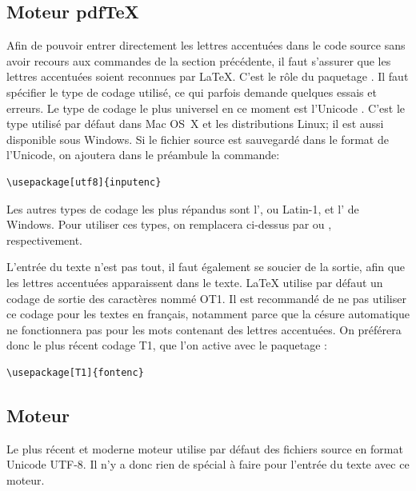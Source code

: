 \subsection{Moteur pdf\TeX}
\label{sec:bases:francais:pdftex}

Afin de pouvoir entrer directement les lettres accentuées dans le code
source sans avoir recours aux commandes de la section précédente, il
faut s'assurer que les lettres accentuées soient reconnues par
{\LaTeX}. C'est le rôle du paquetage  \citep{inputenc}.
Il faut spécifier le type de codage utilisé, ce qui parfois demande
quelques essais et erreurs. Le type de codage le plus universel en ce
moment est l'Unicode \citep{Unicode:5.0}. C'est le type utilisé par
défaut dans Mac OS~X et les distributions Linux; il est aussi
disponible sous Windows. Si le fichier source est sauvegardé dans le
format %
de l'Unicode, on ajoutera dans le préambule la commande:
\begin{lstlisting}
\usepackage[utf8]{inputenc}
\end{lstlisting}

Les autres types de codage les plus répandus sont
l', ou
Latin-1, et l'
de Windows. Pour utiliser ces types, on remplacera 
ci-dessus par  ou , respectivement.

L'entrée du texte n'est pas tout, il faut également se soucier de la
sortie, afin que les lettres accentuées apparaissent dans le texte.
{\LaTeX} utilise par défaut un codage de sortie des caractères nommé
OT1. Il est recommandé de ne pas utiliser ce codage pour les textes en
français, notamment parce que la césure automatique ne fonctionnera
pas pour les mots contenant des lettres accentuées. On préférera donc
le plus récent codage T1, que l'on active avec le paquetage
 \citep{fontenc}:
\begin{lstlisting}
\usepackage[T1]{fontenc}
\end{lstlisting}

\subsection{Moteur \XeTeX}
\label{sec:bases:francais:xetex}

Le plus récent et moderne moteur {\XeTeX} utilise par défaut des
fichiers source en format Unicode UTF-8. Il n'y a donc rien de spécial
à faire pour l'entrée du texte avec ce moteur.


